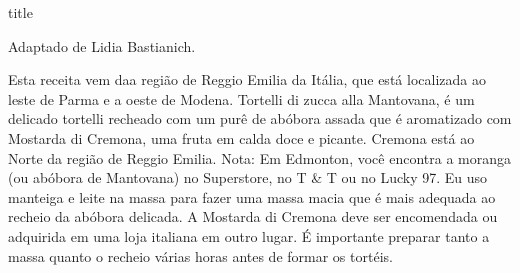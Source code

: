 \documentclass [11pt, letterpaper] {article}
\begin{document}
 {title}

\begin {flushright}
Adaptado de Lidia Bastianich.
\end {flushright}

Esta receita vem  daa região de Reggio Emilia da Itália, que está localizada ao leste de Parma e a oeste de Modena. Tortelli di zucca alla Mantovana, é um delicado tortelli recheado com um purê de abóbora assada que é aromatizado com Mostarda di Cremona, uma fruta em calda doce e picante. Cremona está ao Norte da região de Reggio Emilia. Nota:
Em Edmonton, você encontra a moranga (ou abóbora de Mantovana) no Superstore, no T \& T ou no Lucky 97. Eu uso manteiga e leite na massa para fazer uma massa macia que é mais adequada ao recheio da abóbora delicada. A Mostarda di Cremona deve ser encomendada ou adquirida em uma loja italiana em outro lugar. É importante preparar tanto a massa quanto o recheio várias horas antes de formar os tort\'eis.
\end{document}

